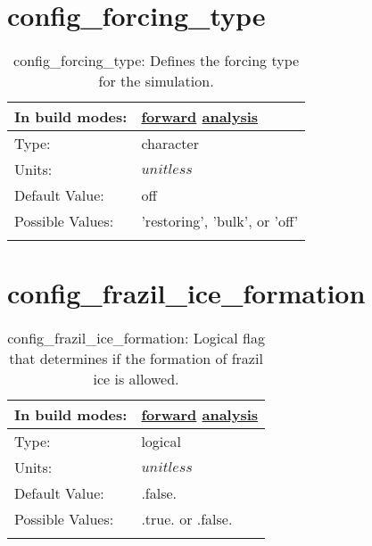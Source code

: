 \section[config\_forcing\_type]{config\_forcing\_type}
\label{sec:nm_sec_config_forcing_type}
\begin{center}
\begin{longtable}{| p{2.0in} || p{4.0in} |}
    \hline
    In build modes: & \hyperref[subsec:forward_nm_tab_forcing]{forward} \hyperref[subsec:analysis_nm_tab_forcing]{analysis} \\
    \hline
    Type: & character \\
    \hline
    Units: & $unitless$ \\
    \hline
    Default Value: & off \\
    \hline
    Possible Values: & 'restoring', 'bulk', or 'off' \\
    \hline
    \caption{config\_forcing\_type: Defines the forcing type for the simulation.}
\end{longtable}
\end{center}
\section[config\_frazil\_ice\_formation]{config\_frazil\_ice\_formation}
\label{sec:nm_sec_config_frazil_ice_formation}
\begin{center}
\begin{longtable}{| p{2.0in} || p{4.0in} |}
    \hline
    In build modes: & \hyperref[subsec:forward_nm_tab_forcing]{forward} \hyperref[subsec:analysis_nm_tab_forcing]{analysis} \\
    \hline
    Type: & logical \\
    \hline
    Units: & $unitless$ \\
    \hline
    Default Value: & .false. \\
    \hline
    Possible Values: & .true. or .false. \\
    \hline
    \caption{config\_frazil\_ice\_formation: Logical flag that determines if the formation of frazil ice is allowed.}
\end{longtable}
\end{center}
